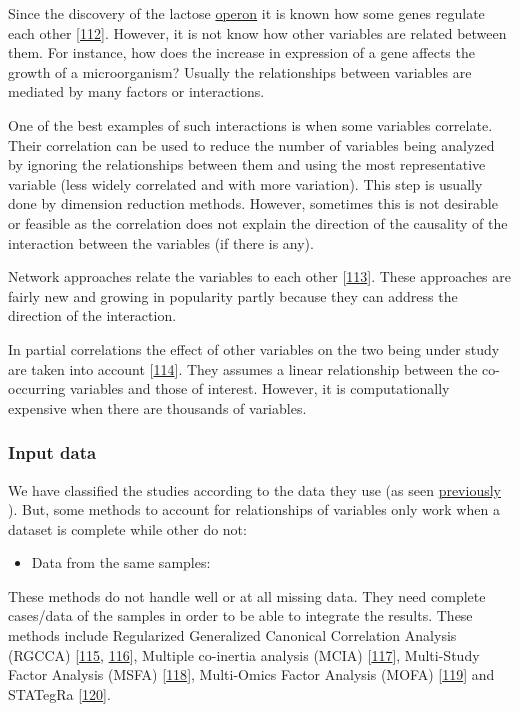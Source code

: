 \documentclass[
  12pt,
  a4paper,
  twoside,
  openright]{book}
\providecommand{\tightlist}{%
  \setlength{\itemsep}{0pt}\setlength{\parskip}{0pt}}
\begin{document}
Since the discovery of the lactose \href{https://en.wikipedia.org/wiki/Operon}{operon} it is known how some genes regulate each other {[}\protect\hyperlink{ref-jacob1961}{112}{]}.
However, it is not know how other variables are related between them.
For instance, how does the increase in expression of a gene affects the growth of a microorganism?
Usually the relationships between variables are mediated by many factors or interactions.

One of the best examples of such interactions is when some variables correlate.
Their correlation can be used to reduce the number of variables being analyzed by ignoring the relationships between them and using the most representative variable (less widely correlated and with more variation).
This step is usually done by dimension reduction methods.
However, sometimes this is not desirable or feasible as the correlation does not explain the direction of the causality of the interaction between the variables (if there is any).

Network approaches relate the variables to each other {[}\protect\hyperlink{ref-koh_iomicspass_2019}{113}{]}.
These approaches are fairly new and growing in popularity partly because they can address the direction of the interaction.

In partial correlations the effect of other variables on the two being under study are taken into account {[}\protect\hyperlink{ref-yule1907}{114}{]}.
They assumes a linear relationship between the co-occurring variables and those of interest.
However, it is computationally expensive when there are thousands of variables.

\hypertarget{input-data}{%
\subsubsection{Input data}\label{input-data}}

We have classified the studies according to the data they use (as seen \protect\hyperlink{data-origin}{previously} ).
But, some methods to account for relationships of variables only work when a dataset is complete while other do not:

\begin{itemize}
\tightlist
\item
  Data from the same samples:
\end{itemize}

These methods do not handle well or at all missing data.
They need complete cases/data of the samples in order to be able to integrate the results.
These methods include Regularized Generalized Canonical Correlation Analysis (RGCCA) {[}\protect\hyperlink{ref-tenenhaus_regularized_2011}{115}, \protect\hyperlink{ref-tenenhaus_variable_2014}{116}{]}, Multiple co-inertia analysis (MCIA) {[}\protect\hyperlink{ref-culhane_cross-platform_2003}{117}{]}, Multi-Study Factor Analysis (MSFA) {[}\protect\hyperlink{ref-vito_multi-study_2019}{118}{]}, Multi-Omics Factor Analysis (MOFA) {[}\protect\hyperlink{ref-argelaguet_multi-omics_2018}{119}{]} and STATegRa {[}\protect\hyperlink{ref-gomez-cabrero2019}{120}{]}.
\end{document}
